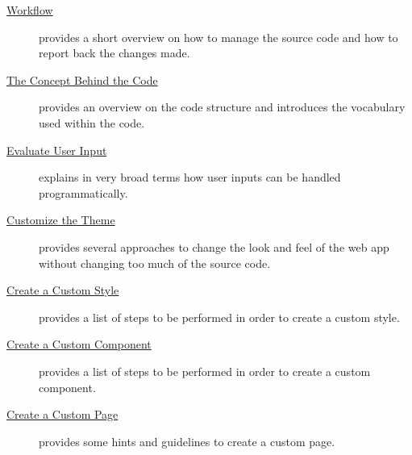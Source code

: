 \documentclass[a4paper,oneside]{book}
\begin{document}
\begin{description}
    \item[\href{https://selfhelp.psy.unibe.ch/demo/extend/432}{Workflow}] provides a short overview on how to manage the source code and how to report back the changes made.
    \item[\href{https://selfhelp.psy.unibe.ch/demo/extend/416}{The Concept Behind the Code}] provides an overview on the code structure and introduces the vocabulary used within the code.
    \item[\href{https://selfhelp.psy.unibe.ch/demo/extend/417}{Evaluate User Input}] explains in very broad terms how user inputs can be handled programmatically.
    \item[\href{https://selfhelp.psy.unibe.ch/demo/extend/419}{Customize the Theme}] provides several approaches to change the look and feel of the web app without changing too much of the source code.
    \item[\href{https://selfhelp.psy.unibe.ch/demo/extend/418}{Create a Custom Style}] provides a list of steps to be performed in order to create a custom style.
    \item[\href{https://selfhelp.psy.unibe.ch/demo/extend/420}{Create a Custom Component}] provides a list of steps to be performed in order to create a custom component.
    \item[\href{https://selfhelp.psy.unibe.ch/demo/extend/421}{Create a Custom Page}] provides some hints and guidelines to create a custom page.
\end{description}
\end{document}
